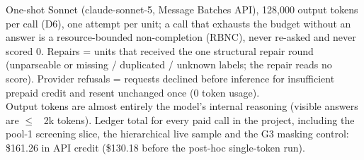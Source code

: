 \begin{table}[tbp]
\centering
\footnotesize
\setlength{\tabcolsep}{3pt}
\caption{Completion, non-completion, repairs and cost of every paid experiment.}
\label{tab:resources}
\ifdim\wd0>\textwidth\resizebox{\textwidth}{!}{\usebox0}\else\usebox0\fi
\begin{flushleft}\footnotesize
One-shot Sonnet (claude-sonnet-5, Message Batches API), 128,000 output tokens per call (D6), one attempt per unit; a call that exhausts the budget without an answer is a resource-bounded non-completion (RBNC), never re-asked and never scored 0. Repairs = units that received the one structural repair round (unparseable or missing / duplicated / unknown labels; the repair reads no score). Provider refusals = requests declined before inference for insufficient prepaid credit and resent unchanged once (0 token usage).\\
Output tokens are almost entirely the model's internal reasoning (visible answers are $\leq$ ~2k tokens). Ledger total for every paid call in the project, including the pool-1 screening slice, the hierarchical live sample and the G3 masking control: \$161.26 in API credit (\$130.18 before the post-hoc single-token run).\\
\end{flushleft}
\end{table}
